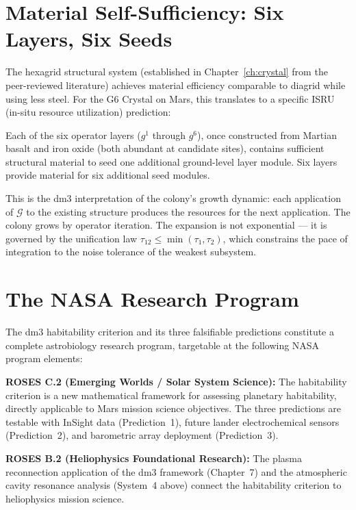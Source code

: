 \section{Material Self-Sufficiency: Six Layers, Six Seeds}
\label{sec:mars-isru}

The hexagrid structural system (established in Chapter~\ref{ch:crystal}
from the peer-reviewed literature) achieves material efficiency
comparable to diagrid while using less steel. For the G6 Crystal on
Mars, this translates to a specific ISRU (in-situ resource utilization)
prediction:

Each of the six operator layers ($g^1$ through $g^6$), once constructed
from Martian basalt and iron oxide (both abundant at candidate sites),
contains sufficient structural material to seed one additional
ground-level layer module. Six layers provide material for six
additional seed modules.

This is the dm3 interpretation of the colony's growth dynamic:
each application of $\mathcal{G}$ to the existing structure produces
the resources for the next application. The colony grows by operator
iteration. The expansion is not exponential --- it is governed by
the unification law $\tau_{12} \leq \min(\tau_1, \tau_2)$, which
constrains the pace of integration to the noise tolerance of the
weakest subsystem.

\section{The NASA Research Program}
\label{sec:mars-nasa}

The dm3 habitability criterion and its three falsifiable predictions
constitute a complete astrobiology research program, targetable at
the following NASA program elements:

\textbf{ROSES C.2 (Emerging Worlds / Solar System Science):}
The habitability criterion is a new mathematical framework for
assessing planetary habitability, directly applicable to Mars
mission science objectives. The three predictions are testable with
InSight data (Prediction~1), future lander electrochemical sensors
(Prediction~2), and barometric array deployment (Prediction~3).

\textbf{ROSES B.2 (Heliophysics Foundational Research):}
The plasma reconnection application of the dm3 framework (Chapter~7)
and the atmospheric cavity resonance analysis (System~4 above)
connect the habitability criterion to heliophysics mission science.

